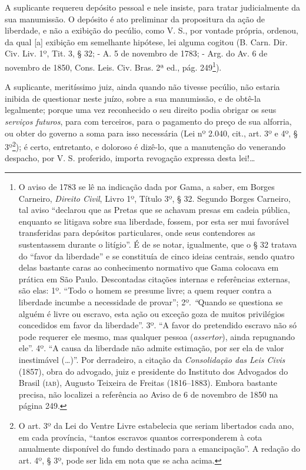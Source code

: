 A suplicante requereu depósito pessoal e nele insiste, para tratar
judicialmente da sua manumissão. O depósito é ato preliminar da
propositura da ação de liberdade, e não a exibição do pecúlio, como V.
S., por vontade própria, ordenou, da qual {[}a{]} exibição em semelhante
hipótese, lei alguma cogitou (B. Carn. Dir. Civ. Liv. 1º, Tit. 3, § 32;
- A. 5 de novembro de 1783; - Arg. do Av. 6 de novembro de 1850, Cons.
Leis. Civ. Bras. 2ª ed., pág. 249\footnote{ O aviso de 1783 se lê na
  indicação dada por Gama, a saber, em Borges Carneiro, \emph{Direito
  Civil}, Livro 1º, Título 3º, § 32. Segundo Borges Carneiro, tal aviso
  ``declarou que as Pretas que se achavam presas em cadeia pública,
  enquanto se litigava sobre sua liberdade, fossem, por esta ser mui
  favorável transferidas para depósitos particulares, onde seus
  contendores as sustentassem durante o litígio''. É de se notar,
  igualmente, que o § 32 tratava do ``favor da liberdade'' e se constituía
  de cinco ideias centrais, sendo quatro delas bastante caras ao
  conhecimento normativo que Gama colocava em prática em São Paulo.
  Descontadas citações internas e referências externas, são elas: 1º.
  ``Todo o homem se presume livre; a quem requer contra a liberdade
  incumbe a necessidade de provar''; 2º. \emph{``}Quando se questiona se
  alguém é livre ou escravo, esta ação ou exceção goza de muitos
  privilégios concedidos em favor da liberdade''. 3º. ``A favor do
  pretendido escravo não só pode requerer ele mesmo, mas qualquer pessoa
  (\emph{assertor}), ainda repugnando ele''. 4º. ``A causa da liberdade
  não admite estimação, por ser ela de valor inestimável (\ldots{})''. Por
  derradeiro, a citação da \emph{Consolidação das Leis Civis} (1857),
  obra do advogado, juiz e presidente do Instituto dos Advogados do
  Brasil (\textsc{iab}), Augusto Teixeira de Freitas (1816--1883). Embora bastante
  precisa, não localizei a referência ao Aviso de 6 de novembro de 1850
  na página 249.}).

A suplicante, meritíssimo juiz, ainda quando não tivesse pecúlio, não
estaria inibida de questionar neste juízo, sobre a sua manumissão, e de
obtê-la legalmente; porque uma vez reconhecido o seu direito podia
obrigar os seus \emph{serviços futuros}, para com terceiros, para o
pagamento do preço de sua alforria, ou obter do governo a soma para isso
necessária (Lei nº 2.040, cit., art. 3º e 4º, § 3º\footnote{ O art. 3º
  da Lei do Ventre Livre estabelecia que seriam libertados cada ano, em
  cada província, ``tantos escravos quantos corresponderem à cota
  anualmente disponível do fundo destinado para a emancipação''. A
  redação do art. 4º, § 3º, pode ser lida em nota que se acha acima.});
é certo, entretanto, e doloroso é dizê-lo, que a manutenção do venerando
despacho, por V. S. proferido, importa revogação expressa desta lei!\ldots{}

